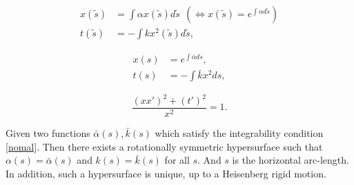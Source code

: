 \documentclass[10pt,a4paper]{amsart}
\begin{document}
\begin{equation}\label{regecu}
\begin{split}
x(\tilde{s})&=\int \alpha x(\tilde{s})d\tilde{s}\ \ \left(\Leftrightarrow x(\tilde{s})=e^{\int\alpha d\tilde{s}}\right)\\
t(\tilde{s})&=-\int kx^2(\tilde{s})d\tilde{s},
\end{split}
\end{equation}

\begin{equation}\label{regecu1}
\begin{split}
x(s)&=e^{\int\bar\alpha ds},\\
t(s)&=-\int \bar{k}x^2 ds,
\end{split}
\end{equation}

\begin{equation}\label{nomal}
\frac{(xx')^{2}+(t')^2}{x^2}=1.
\end{equation}

\begin{thm}\label{funthm1}
Given two functions $\bar\alpha(s),\bar{k}(s)$ which satisfy the integrability condition \eqref{nomal}.
Then there exists a rotationally symmetric hypersurface such that $\alpha(s)=\bar\alpha(s)$ and $k(s)=\bar k(s)$ for all $s$. And $s$ is the horizontal arc-length. In addition, such a hypersurface is unique, up to a Heisenberg rigid motion.
\end{thm}
\end{document}
